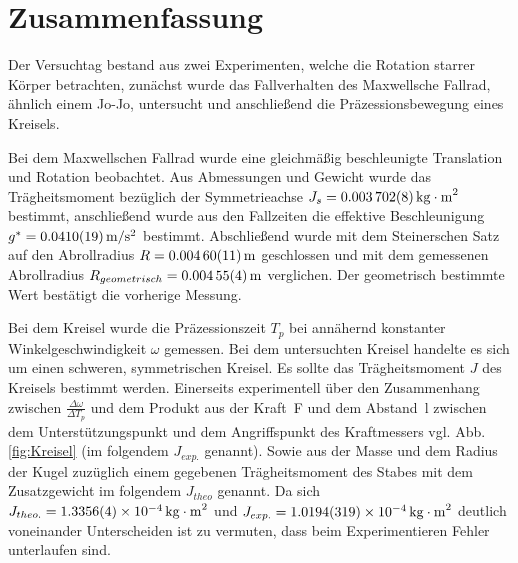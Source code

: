 
\section{Zusammenfassung}\label{kap:Zusammenfassung}

Der Versuchtag bestand aus zwei Experimenten, welche die Rotation starrer Körper betrachten, zunächst wurde das Fallverhalten des Maxwellsche Fallrad, ähnlich einem Jo-Jo, untersucht und anschließend die Präzessionsbewegung eines Kreisels. 



Bei dem Maxwellschen Fallrad wurde eine gleichmäßig beschleunigte Translation und Rotation beobachtet.
Aus Abmessungen und Gewicht wurde das Trägheitsmoment bezüglich der Symmetrieachse $J_s=\SI{0.003702 \pm 0.000008}{kg\cdot m^2}$ bestimmt, anschließend wurde aus den Fallzeiten die effektive Beschleunigung  $g^*=\SI{0.0410 \pm  0.0019}{m \per s \squared}$ bestimmt. Abschließend wurde mit dem Steinerschen Satz auf den Abrollradius $R=\SI{0.00460\pm 0.00011}{m}$ geschlossen und mit dem gemessenen Abrollradius $R_{geometrisch}=\SI{0.00455 \pm 0.00004}{m}$ verglichen. Der geometrisch bestimmte Wert bestätigt die vorherige Messung. 







Bei dem Kreisel wurde die Präzessionszeit $T_p$ bei annähernd konstanter Winkelgeschwindigkeit $\omega$ gemessen. Bei dem untersuchten Kreisel handelte es sich um einen schweren, symmetrischen Kreisel.
Es sollte das Trägheitsmoment $J$ des Kreisels bestimmt werden. Einerseits experimentell über den Zusammenhang zwischen $\frac{\Delta \omega}{\Delta T_p}$ und dem Produkt aus der Kraft~F und dem Abstand~l zwischen dem Unterstützungspunkt und dem Angriffspunkt des Kraftmessers vgl. Abb. \ref{fig:Kreisel} (im folgendem $J_{exp.}$ genannt). Sowie aus der Masse und dem Radius der Kugel zuzüglich einem gegebenen Trägheitsmoment des Stabes mit dem Zusatzgewicht im folgendem $J_{theo}$ genannt. Da sich $J_{theo.}=\SI{1,3356+-0,0004e-4}{kg \cdot m^2}$ und $J_{exp.}=\SI{1,0194+-0,0319e-4}{kg \cdot m^2}$ deutlich voneinander Unterscheiden ist zu vermuten, dass beim Experimentieren Fehler unterlaufen sind.  
 









